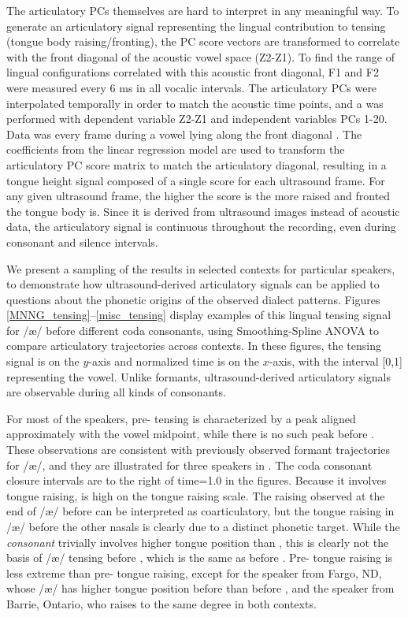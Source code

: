 \documentclass[output=paper]{LSP/langsci}
\begin{document}
The articulatory PCs themselves are hard to interpret in any meaningful way.  To generate an articulatory signal representing the lingual contribution to tensing (tongue body raising/fronting), the PC score vectors are transformed to correlate with the front diagonal of the acoustic vowel space (Z2-Z1). To find the range of lingual configurations correlated with this acoustic front diagonal, F1 and F2 were measured every 6 ms in all vocalic intervals.  The articulatory PCs were interpolated temporally in order to match the acoustic time points, and a  was performed with dependent variable Z2-Z1 and independent variables PCs 1-20. Data was every frame during a vowel lying along the front diagonal . The coefficients from the linear regression model are used to transform the articulatory PC score matrix to match the articulatory diagonal, resulting in a tongue height signal composed of a single score for each ultrasound frame. For any given ultrasound frame, the higher the score is the more raised and fronted the tongue body is.  Since it is derived from ultrasound images instead of acoustic data, the articulatory signal is continuous throughout the recording, even during consonant and silence intervals.

We present a sampling of the results in selected contexts for particular speakers, to demonstrate how ultrasound-derived articulatory signals can be applied to questions about the phonetic origins of the observed dialect patterns.  Figures \ref{MNNG_tensing}--\ref{misc_tensing} display examples of this lingual tensing signal for /æ/ before different coda consonants, using Smoothing-Spline ANOVA \citep{gu_smoothing_2002} to compare articulatory trajectories across contexts. In these figures, the tensing signal is on the $y$-axis and normalized time is on the $x$-axis, with the interval [0,1] representing the vowel.  Unlike formants, ultrasound-derived articulatory signals are observable during all kinds of consonants.

For most of the speakers, pre- tensing is characterized by a peak aligned approximately with the vowel midpoint, while there is no such peak before .  These observations are consistent with previously observed formant trajectories for /æ/, and they are illustrated for three speakers in  .  The coda consonant closure intervals are to the right of time=1.0 in the figures. Because it involves tongue raising,  is high on the tongue raising scale. The raising observed at the end of /æ/ before  can be interpreted as coarticulatory, but the tongue raising in /æ/ before the other nasals is clearly due to a distinct phonetic target.  While the \textit{consonant}  trivially involves higher tongue position than , this is clearly not the basis of /æ/ tensing before , which is the same as before . Pre- tongue raising is less extreme than pre- tongue raising, except for the speaker from Fargo, ND, whose /æ/ has higher tongue position before  than before , and the speaker from Barrie, Ontario, who raises to the same degree in both contexts.
\end{document}
